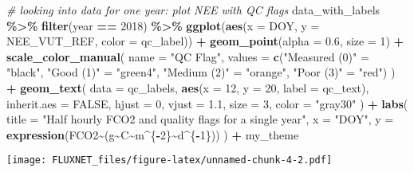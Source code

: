 \documentclass[
]{article}
\newenvironment{Shaded}{\begin{snugshade}}{\end{snugshade}}
\newcommand{\AttributeTok}[1]{\textcolor[rgb]{0.13,0.29,0.53}{#1}}
\newcommand{\CommentTok}[1]{\textcolor[rgb]{0.56,0.35,0.01}{\textit{#1}}}
\newcommand{\ConstantTok}[1]{\textcolor[rgb]{0.56,0.35,0.01}{#1}}
\newcommand{\DecValTok}[1]{\textcolor[rgb]{0.00,0.00,0.81}{#1}}
\newcommand{\FloatTok}[1]{\textcolor[rgb]{0.00,0.00,0.81}{#1}}
\newcommand{\FunctionTok}[1]{\textcolor[rgb]{0.13,0.29,0.53}{\textbf{#1}}}
\newcommand{\NormalTok}[1]{#1}
\newcommand{\OtherTok}[1]{\textcolor[rgb]{0.56,0.35,0.01}{#1}}
\newcommand{\SpecialCharTok}[1]{\textcolor[rgb]{0.81,0.36,0.00}{\textbf{#1}}}
\newcommand{\StringTok}[1]{\textcolor[rgb]{0.31,0.60,0.02}{#1}}
\begin{document}
\begin{Shaded}
\begin{Highlighting}[]
\CommentTok{\# looking into data for one year: plot NEE with QC flags}
\NormalTok{data\_with\_labels }\SpecialCharTok{\%\textgreater{}\%}
  \FunctionTok{filter}\NormalTok{(year }\SpecialCharTok{==} \DecValTok{2018}\NormalTok{) }\SpecialCharTok{\%\textgreater{}\%} 
  \FunctionTok{ggplot}\NormalTok{(}\FunctionTok{aes}\NormalTok{(}\AttributeTok{x =}\NormalTok{ DOY, }\AttributeTok{y =}\NormalTok{ NEE\_VUT\_REF, }\AttributeTok{color =}\NormalTok{ qc\_label)) }\SpecialCharTok{+}
  \FunctionTok{geom\_point}\NormalTok{(}\AttributeTok{alpha =} \FloatTok{0.6}\NormalTok{, }\AttributeTok{size =} \DecValTok{1}\NormalTok{) }\SpecialCharTok{+}
  \FunctionTok{scale\_color\_manual}\NormalTok{(}
    \AttributeTok{name =} \StringTok{"QC Flag"}\NormalTok{,}
    \AttributeTok{values =} \FunctionTok{c}\NormalTok{(}\StringTok{"Measured (0)"} \OtherTok{=} \StringTok{"black"}\NormalTok{,}
               \StringTok{"Good (1)"} \OtherTok{=} \StringTok{"green4"}\NormalTok{,}
               \StringTok{"Medium (2)"} \OtherTok{=} \StringTok{"orange"}\NormalTok{,}
               \StringTok{"Poor (3)"} \OtherTok{=} \StringTok{"red"}\NormalTok{)}
\NormalTok{  ) }\SpecialCharTok{+}
  \FunctionTok{geom\_text}\NormalTok{(}
    \AttributeTok{data =}\NormalTok{ qc\_labels,}
    \FunctionTok{aes}\NormalTok{(}\AttributeTok{x =} \DecValTok{12}\NormalTok{, }\AttributeTok{y =} \DecValTok{20}\NormalTok{, }\AttributeTok{label =}\NormalTok{ qc\_text),}
    \AttributeTok{inherit.aes =} \ConstantTok{FALSE}\NormalTok{,}
    \AttributeTok{hjust =} \DecValTok{0}\NormalTok{,}
    \AttributeTok{vjust =} \FloatTok{1.1}\NormalTok{,}
    \AttributeTok{size =} \DecValTok{3}\NormalTok{,}
    \AttributeTok{color =} \StringTok{"gray30"}
\NormalTok{  ) }\SpecialCharTok{+}
  \FunctionTok{labs}\NormalTok{(}
    \AttributeTok{title =} \StringTok{"Half hourly FCO2 and quality flags for a single year"}\NormalTok{,}
    \AttributeTok{x =} \StringTok{"DOY"}\NormalTok{, }\AttributeTok{y =} \FunctionTok{expression}\NormalTok{(FCO2}\SpecialCharTok{\textasciitilde{}}\NormalTok{(g}\SpecialCharTok{\textasciitilde{}}\NormalTok{C}\SpecialCharTok{\textasciitilde{}}\NormalTok{m}\SpecialCharTok{\^{}}\NormalTok{\{}\SpecialCharTok{{-}}\DecValTok{2}\NormalTok{\}}\SpecialCharTok{\textasciitilde{}}\NormalTok{d}\SpecialCharTok{\^{}}\NormalTok{\{}\SpecialCharTok{{-}}\DecValTok{1}\NormalTok{\})) }
\NormalTok{  ) }\SpecialCharTok{+}\NormalTok{ my\_theme}
\end{Highlighting}
\end{Shaded}

\texttt{[image: FLUXNET\_files/figure-latex/unnamed-chunk-4-2.pdf]}
\end{document}
